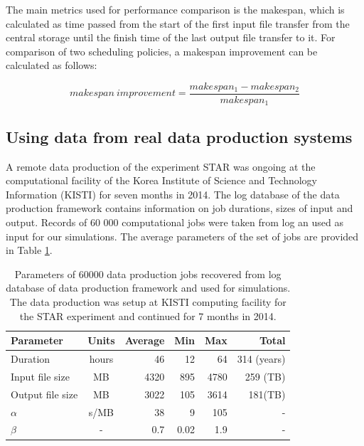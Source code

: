 \documentclass{svjour3}                     %
\begin{document}
The main metrics used for performance comparison is the makespan, which is calculated as time passed from the start of the first input file transfer from the central storage until the finish time of the last output file transfer to it. For comparison of two scheduling policies, a makespan improvement can be calculated as follows:


\begin{equation}
\label{makespanImprovement}
 makespan~improvement = \frac{makespan_{1} - makespan_{2}}{makespan_{1}} 
\end{equation}

\subsection{Using data from real data production systems}

A remote data production of the experiment STAR was ongoing at the computational facility of the Korea Institute of Science and Technology Information (KISTI)\cite{KISTI} for seven months in 2014. The log database of the data production framework contains information on job durations, sizes of input and output. Records of 60 000 computational jobs were taken from log an used as input for our simulations. The average parameters of the set of jobs are provided in Table \ref{tab:jobs}.

\begin{table}
\caption{Parameters of 60000 data production jobs recovered from log database of data production framework and used for simulations. The data production was setup at KISTI computing facility for the STAR experiment and continued for 7 months in 2014.}
\label{tab:jobs}
\begin{center}
\begin{tabular}{ l  c  r  r  r	|r }
\hline %
  Parameter  & Units& Average & Min & Max & Total \\ \hline %
  Duration & hours & 46 & 12&64&314 (years) \\ 
  Input file size & MB & 4320& 895&4780&259 (TB) \\	
  Output file size & MB & 3022& 105&3614&181(TB) \\
  $\alpha$ & s/MB & 38& 9&105&- \\
  $\beta$ & - & 0.7& 0.02& 1.9&-\\	
  \hline %
\end{tabular}
    \end{center}
\end{table}
\end{document}
